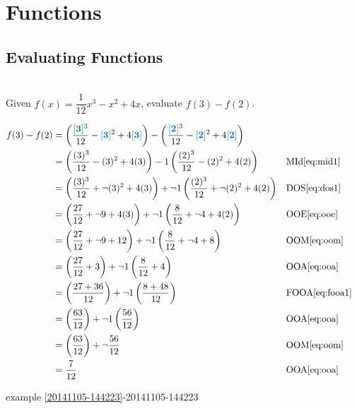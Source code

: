 %
%


\chapter{Functions}


\section{Evaluating Functions}\label{Evaluating Functions}

\begin{example}[id:20141106-083703]\label{20141106-083703} \hfill \\
Given $f(x)= \dfrac{1}{12}x^3-x^2+4x$, evaluate $f(3)-f(2)$.

\soln

\solnsteps
\begin{align*}
f(3)-f(2) & = \left(\dfrac{\farg{3}^3}{12} - \farg{3}^2 + 4\farg{3} \right) - \left(\dfrac{\farg{2}^3}{12} - \farg{2}^2 + 4\farg{2} \right) \\
&= \left(\dfrac{(3)^3}{12} - (3)^2 + 4(3) \right) - 1 \left(\dfrac{(2)^3}{12} - (2)^2 + 4(2) \right) && \text{MId} \eqref{eq:mid1} \\
&= \left(\dfrac{(3)^3}{12} + \neg  (3)^2 + 4(3)\right) + \neg 1 \left(\dfrac{(2)^3}{12} + \neg (2)^2 + 4(2) \right) && \text{DOS} \eqref{eq:dos1} \\
&= \left(\dfrac{27}{12} + \neg 9 + 4(3) \right)+ \neg 1 \left(\dfrac{8}{12} + \neg 4 + 4(2) \right) && \text{OOE} \eqref{eq:ooe} \\
&= \left(\dfrac{27}{12} + \neg 9 + 12 \right) + \neg 1 \left(\dfrac{8}{12} + \neg 4 + 8 \right) && \text{OOM} \eqref{eq:oom} \\
&= \left(\dfrac{27}{12} + 3 \right) + \neg 1 \left(\dfrac{8}{12} + 4 \right) && \text{OOA} \eqref{eq:ooa} \\
&= \left(\dfrac{27+36}{12} \right) + \neg 1 \left(\dfrac{8+48}{12}\right) && \text{FOOA} \eqref{eq:fooa1} \\
&= \left(\dfrac{63}{12} \right) + \neg 1 \left(\dfrac{56}{12}\right) && \text{OOA} \eqref{eq:ooa} \\
&= \left(\dfrac{63}{12} \right) + \neg \dfrac{56}{12} && \text{OOM} \eqref{eq:oom} \\
&= \dfrac{7}{12} && \text{OOA} \eqref{eq:ooa} 
\end{align*}

\qdepend 

\qdependlist

example \ref{20141105-144223}-20141105-144223


\end{example}

